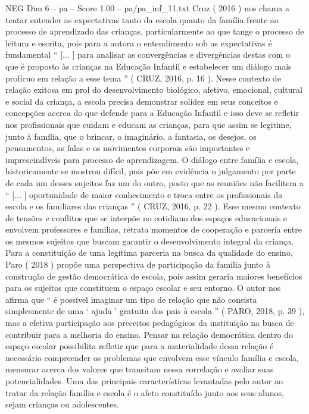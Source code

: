 \begin{textsample}{NEG Dim 6 – pa – Score 1.00 – pa/pa\_inf\_11.txt}
Cruz ( 2016 ) nos chama a tentar entender as expectativas tanto da escola quanto da família frente ao processo de aprendizado das crianças, particularmente ao que tange o processo de leitura e escrita, pois para a autora o entendimento sob as expectativas é fundamental “ [... ] para analisar as convergências e divergências destas com o que é proposto às crianças na Educação Infantil e estabelecer um diálogo mais profícuo em relação a esse tema ” ( CRUZ, 2016, p. 16 ).
Nesse contexto de relação exitosa em prol do desenvolvimento biológico, afetivo, emocional, cultural e social da criança, a escola precisa demonstrar solidez em seus conceitos e concepções acerca do que defende para a Educação Infantil e isso deve se refletir nos profissionais que cuidam e educam as crianças, para que assim se legitime, junto à família, que o brincar, o imaginário, a fantasia, os desejos, os pensamentos, as falas e os movimentos corporais são importantes e imprescindíveis para processo de aprendizagem.
O diálogo entre família e escola, historicamente se mostrou difícil, pois põe em evidência o julgamento por parte de cada um desses sujeitos faz um do outro, posto que as reuniões não facilitem a “ [... ] oportunidade de maior conhecimento e troca entre os profissionais da escola e os familiares das crianças ” ( CRUZ, 2016, p. 22 ).
Esse mesmo contexto de tensões e conflitos que se interpõe no cotidiano dos espaços educacionais e envolvem professores e famílias, retrata momentos de cooperação e parceria entre os mesmos sujeitos que buscam garantir o desenvolvimento integral da criança.
Para a constituição de uma legítima parceria na busca da qualidade do ensino, Paro ( 2018 ) propõe uma perspectiva de participação da família junto à construção de gestão democrática de escola, pois assim geraria maiores benefícios para os sujeitos que constituem o espaço escolar e seu entorno.
O autor nos afirma que “ é possível imaginar um tipo de relação que não consista simplesmente de uma ‘ ajuda ’ gratuita dos pais à escola ” ( PARO, 2018, p. 39 ), mas a efetiva participação aos preceitos pedagógicos da instituição na busca de contribuir para a melhoria do ensino.
Pensar na relação democrática dentro do espaço escolar possibilita refletir que para a materialidade dessa relação é necessário compreender os problemas que envolvem esse vínculo família e escola, mensurar acerca dos valores que transitam nessa correlação e avaliar suas potencialidades.
Uma das principais características levantadas pelo autor ao tratar da relação família e escola é o afeto constituído junto aos seus alunos, sejam crianças ou adolescentes.

\end{textsample}
